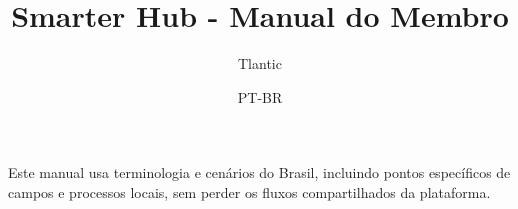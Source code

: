 \documentclass[11pt,a4paper]{report}
\title{Smarter Hub - Manual do Membro}
\author{Tlantic}
\date{PT-BR}
\begin{document}
\maketitle
\begin{manualnote}
Este manual usa terminologia e cenários do Brasil, incluindo pontos específicos de campos e processos locais, sem perder os fluxos compartilhados da plataforma.
\end{manualnote}
\tableofcontents

\end{document}
